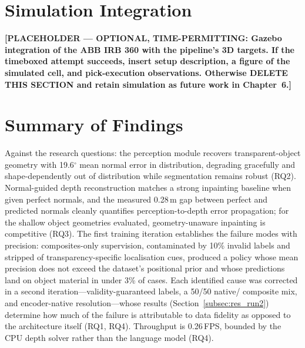 \section{Simulation Integration}
\label{sec:res_gazebo}

\textbf{[PLACEHOLDER --- OPTIONAL, TIME-PERMITTING: Gazebo integration of the ABB IRB 360 with the pipeline's 3D targets. If the timeboxed attempt succeeds, insert setup description, a figure of the simulated cell, and pick-execution observations. Otherwise DELETE THIS SECTION and retain simulation as future work in Chapter~6.]}

\section{Summary of Findings}
\label{sec:res_summary}

Against the research questions: the perception module recovers transparent-object geometry with 19.6$^{\circ}$ mean normal error in distribution, degrading gracefully and shape-dependently out of distribution while segmentation remains robust (RQ2). Normal-guided depth reconstruction matches a strong inpainting baseline when given perfect normals, and the measured 0.28\,m gap between perfect and predicted normals cleanly quantifies perception-to-depth error propagation; for the shallow object geometries evaluated, geometry-unaware inpainting is competitive (RQ3). 
The first training iteration establishes the failure modes with precision:
composites-only supervision, contaminated by 10\% invalid labels and stripped
of transparency-specific localisation cues, produced a policy whose mean
precision does not exceed the dataset's positional prior and whose predictions
land on object material in under 3\% of cases. Each identified cause was
corrected in a second iteration---validity-guaranteed labels, a 50/50 native/
composite mix, and encoder-native resolution---whose results
(Section~\ref{subsec:res_run2}) determine how much of the failure is
attributable to data fidelity as opposed to the architecture itself (RQ1,
RQ4). Throughput is 0.26\,FPS, bounded by the CPU depth solver 
rather than the language model (RQ4).